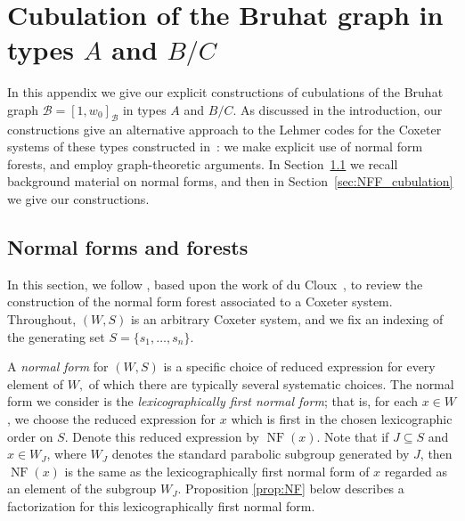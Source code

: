 \documentclass[11pt]{amsart}
\theoremstyle{plain}
\theoremstyle{definition}
\newcommand{\cB}{\mathcal B}
\newcommand{\WJ}{W_J}
\newcommand{\NF}{\operatorname{NF}} %
\numberwithin{equation}{subsection}
\begin{document}

\appendix

\section{Cubulation of the Bruhat graph in types \texorpdfstring{$A$}{A} and \texorpdfstring{$B/C$}{B/C}}\label{sec:appendix}

In this appendix we give our explicit constructions of cubulations of the Bruhat graph $\cB = [1,w_0]_\cB$ in types $A$ and $B/C$. As discussed in the introduction, our constructions give an alternative approach to the Lehmer codes for the Coxeter systems of these types constructed in~\cite{Bolognini2025}: we make explicit use of normal form forests, and employ graph-theoretic arguments. In Section~\ref{sec:NF} we recall background material on normal forms, and then in Section~\ref{sec:NFF_cubulation} we give our constructions.


\subsection{Normal forms and forests}\label{sec:NF}

In this section, we follow \cite[Sec.~3.4]{BjoernerBrenti}, based upon the work of du Cloux~\cite{duCloux}, to review the construction of the normal form forest associated to a Coxeter system. Throughout, $(W,S)$ is an arbitrary Coxeter system, and we fix an indexing of the generating set $S = \{ s_1, \dots, s_n\}$.

A \emph{normal form} for $(W,S)$ is a specific choice of reduced expression for every element of $W,$ of which there are typically several systematic choices. 
The normal form we consider is the \emph{lexicographically first normal form}; that is, for each $x \in W$, we choose the reduced expression for $x$ which is first in the chosen lexicographic order on $S$. Denote this reduced expression by $\NF(x)$. Note that if $J \subseteq S$ and $x \in W_J$, where $\WJ$ denotes the standard parabolic subgroup generated by $J$, then $\NF(x)$ is the same as the lexicographically first normal form of $x$ regarded as an element of the subgroup $W_J$. Proposition \ref{prop:NF} below describes a factorization for this lexicographically first normal form. 
\end{document}
